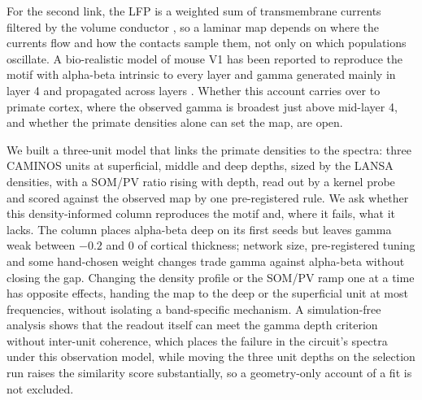 For the second link, the LFP is a weighted sum of transmembrane currents filtered by the volume conductor
\citep{Buzsaki2012,Einevoll2013}, so a laminar map depends on where the currents flow and how the contacts sample
them, not only on which populations oscillate. A bio-realistic model of mouse V1 \citep{Billeh2020} has been reported
to reproduce the motif with alpha-beta intrinsic to every layer and gamma generated mainly in layer 4 and propagated
across layers \citep{Herrera2026}. Whether this account carries over to primate cortex, where the observed gamma is broadest just
above mid-layer 4, and whether the primate densities alone can set the map, are open.

We built a three-unit model that links the primate densities to the spectra: three CAMINOS units at superficial,
middle and deep depths, sized by the LANSA densities, with a SOM/PV ratio rising with depth, read out by a kernel
probe and scored against the observed map by one pre-registered rule. We ask whether this density-informed column
reproduces the motif and, where it fails, what it lacks. The column places alpha-beta deep on its first seeds but
leaves gamma weak between $-0.2$ and 0 of cortical thickness; network size, pre-registered tuning and some hand-chosen
weight changes trade gamma against alpha-beta without closing the gap. Changing the density profile or the SOM/PV
ramp one at a time has opposite effects, handing the map to the deep or the superficial unit at most frequencies,
without isolating a band-specific mechanism. A simulation-free analysis shows that the readout itself can meet the
gamma depth criterion without inter-unit coherence, which places the failure in the circuit's spectra under this observation model, while moving
the three unit depths on the selection run raises the similarity score substantially, so a geometry-only account of a fit is not excluded.
